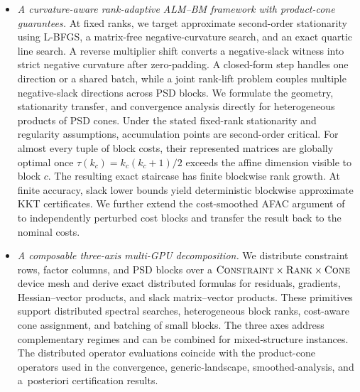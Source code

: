\documentclass[11pt]{article}
\theoremstyle{definition}
\theoremstyle{remark}
\newcommand{\name}{\textsc{CARDAL}\xspace}
\begin{document}
\begin{itemize}
\item \emph{A curvature-aware rank-adaptive ALM--BM framework with
product-cone guarantees.}
At fixed ranks, we target approximate second-order stationarity using
L-BFGS, a matrix-free negative-curvature search, and an exact quartic line
search.  A reverse multiplier shift converts a negative-slack witness
into strict negative curvature after zero-padding.  A closed-form step handles
one direction or a shared batch, while a joint rank-lift problem couples
multiple negative-slack directions across PSD blocks.  We formulate the
geometry, stationarity transfer, and convergence analysis directly for
heterogeneous products of PSD cones.  Under the stated fixed-rank stationarity
and regularity assumptions, accumulation points are second-order critical.
For almost every tuple of block costs, their represented matrices are globally
optimal once $\tau(k_c)=k_c(k_c+1)/2$ exceeds the affine dimension visible to
block $c$.
The resulting exact staircase has finite blockwise rank growth.  At finite
accuracy, slack lower bounds yield deterministic blockwise approximate KKT
certificates.  We further extend the cost-smoothed AFAC argument
of~\cite{cifuentes2022polynomial} to independently perturbed cost blocks and
transfer the result back to the nominal costs.

\item \emph{A composable three-axis multi-GPU decomposition.}
We distribute constraint rows, factor columns, and PSD blocks over a
$\textsc{Constraint}\times\textsc{Rank}\times\textsc{Cone}$ device mesh and
derive exact distributed formulas for residuals, gradients,
Hessian--vector products, and slack matrix--vector products.  These primitives
support distributed spectral searches, heterogeneous block ranks, cost-aware
cone assignment, and batching of small blocks.  The three axes address
complementary regimes and can be combined for mixed-structure instances.  The distributed
operator evaluations coincide with the product-cone operators used in the
convergence, generic-landscape, smoothed-analysis, and \mbox{a posteriori}
certification results.
\end{itemize}

\end{document}
